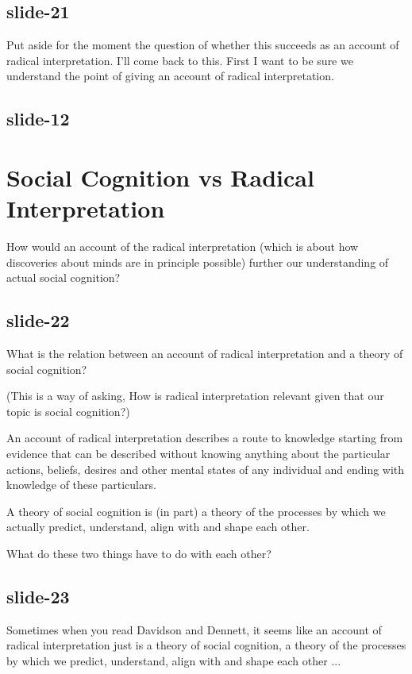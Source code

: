\documentclass[12pt,\papersize]{extarticle}
\begin{document}
\subsection{slide-21}
Put aside for the moment the question of whether this succeeds as an account
of radical interpretation.
I’ll come back to this.
First I want to be sure we understand the point of giving
an account of radical interpretation.

\subsection{slide-12}


\section{Social Cognition vs Radical Interpretation}

How would an account of the radical interpretation (which is about how discoveries about
minds are in principle possible) further our understanding of actual social
cognition?

\subsection{slide-22}
What is the relation between an account of radical interpretation
and a theory of social cognition?

(This is a way of asking, How is radical interpretation relevant given
that our topic is social cognition?)

An account of radical interpretation describes a route to knowledge
starting from  evidence that can be described without knowing anything about the
particular actions, beliefs, desires and other mental states of any individual
and ending with knowledge of these particulars.

A theory of social cognition is (in part) a theory of the processes by
which we actually predict, understand, align with and shape each other.

What do these two things have to do with each other?

\subsection{slide-23}
Sometimes when you read Davidson and Dennett, it seems like an account
of radical interpretation just is a theory of social cognition, a theory
of the processes by which we predict, understand, align with and
shape each other  ...
\end{document}
